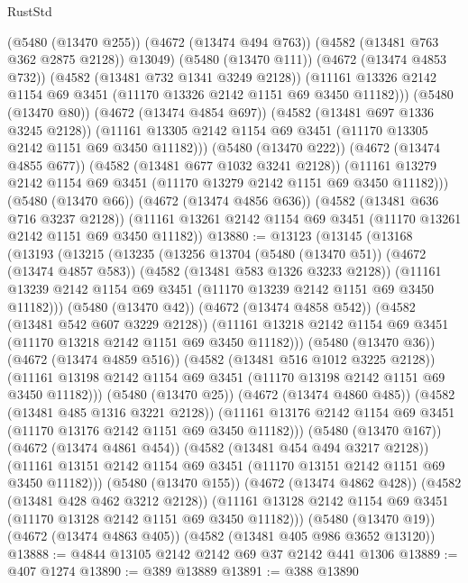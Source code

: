 \begin{lexlean}{RustStd}
\begin{coremodule}
{\begin{coremodule}
{{{{{{{{{{{{{{{{            (@5480 (@13470 @255))
            (@4672 (@13474 @494 @763))
            (@4582 (@13481 @763 @362 @2875 @2128))
            @13049)
          (@5480 (@13470 @111))
          (@4672 (@13474 @4853 @732))
          (@4582 (@13481 @732 @1341 @3249 @2128))
          (@11161 @13326 @2142 @1154 @69 @3451 (@11170 @13326 @2142 @1151 @69 @3450 @11182)))
        (@5480 (@13470 @80))
        (@4672 (@13474 @4854 @697))
        (@4582 (@13481 @697 @1336 @3245 @2128))
        (@11161 @13305 @2142 @1154 @69 @3451 (@11170 @13305 @2142 @1151 @69 @3450 @11182)))
      (@5480 (@13470 @222))
      (@4672 (@13474 @4855 @677))
      (@4582 (@13481 @677 @1032 @3241 @2128))
      (@11161 @13279 @2142 @1154 @69 @3451 (@11170 @13279 @2142 @1151 @69 @3450 @11182)))
    (@5480 (@13470 @66))
    (@4672 (@13474 @4856 @636))
    (@4582 (@13481 @636 @716 @3237 @2128))
    (@11161 @13261 @2142 @1154 @69 @3451 (@11170 @13261 @2142 @1151 @69 @3450 @11182))
@13880 := @13123
    (@13145
      (@13168
        (@13193
          (@13215
            (@13235
              (@13256
                @13704
                (@5480 (@13470 @51))
                (@4672 (@13474 @4857 @583))
                (@4582 (@13481 @583 @1326 @3233 @2128))
                (@11161 @13239 @2142 @1154 @69 @3451 (@11170 @13239 @2142 @1151 @69 @3450 @11182)))
              (@5480 (@13470 @42))
              (@4672 (@13474 @4858 @542))
              (@4582 (@13481 @542 @607 @3229 @2128))
              (@11161 @13218 @2142 @1154 @69 @3451 (@11170 @13218 @2142 @1151 @69 @3450 @11182)))
            (@5480 (@13470 @36))
            (@4672 (@13474 @4859 @516))
            (@4582 (@13481 @516 @1012 @3225 @2128))
            (@11161 @13198 @2142 @1154 @69 @3451 (@11170 @13198 @2142 @1151 @69 @3450 @11182)))
          (@5480 (@13470 @25))
          (@4672 (@13474 @4860 @485))
          (@4582 (@13481 @485 @1316 @3221 @2128))
          (@11161 @13176 @2142 @1154 @69 @3451 (@11170 @13176 @2142 @1151 @69 @3450 @11182)))
        (@5480 (@13470 @167))
        (@4672 (@13474 @4861 @454))
        (@4582 (@13481 @454 @494 @3217 @2128))
        (@11161 @13151 @2142 @1154 @69 @3451 (@11170 @13151 @2142 @1151 @69 @3450 @11182)))
      (@5480 (@13470 @155))
      (@4672 (@13474 @4862 @428))
      (@4582 (@13481 @428 @462 @3212 @2128))
      (@11161 @13128 @2142 @1154 @69 @3451 (@11170 @13128 @2142 @1151 @69 @3450 @11182)))
    (@5480 (@13470 @19))
    (@4672 (@13474 @4863 @405))
    (@4582 (@13481 @405 @986 @3652 @13120))
@13888 := @4844 @13105 @2142 @2142 @69 @37 @2142 @441 @1306
@13889 := @407 @1274
@13890 := @389 @13889
@13891 := @388 @13890
}}}}}}}}}}}}}}}}
\end{coremodule}}
\end{coremodule}
\end{lexlean}
